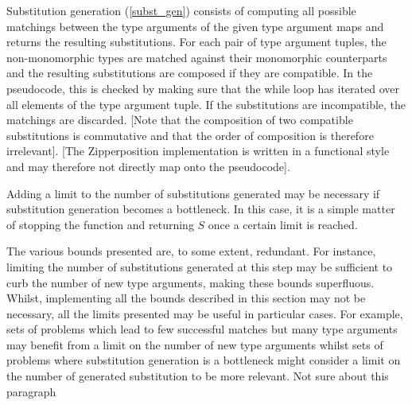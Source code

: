 \documentclass[]{ceurart}
\begin{document}
Substitution generation (\ref{subst_gen}) consists of computing all possible matchings between the type arguments of the given type argument maps and returns the resulting substitutions. For each pair of type argument tuples, the non-monomorphic types are matched against their monomorphic counterparts and the resulting substitutions are composed if they are compatible. In the pseudocode, this is checked by making sure that the while loop has iterated over all elements of the type argument tuple. If the substitutions are incompatible, the matchings are discarded. [Note that the composition of two compatible substitutions is commutative and that the order of composition is therefore irrelevant]. [The Zipperposition implementation is written in a functional style and may therefore not directly map onto the pseudocode].

Adding a limit to the number of substitutions generated may be necessary if substitution generation becomes a bottleneck. In this case, it is a simple matter of stopping the function and returning \(S\) once a certain limit is reached.

The various bounds presented are, to some extent, redundant. For instance, limiting the number of substitutions generated at this step may be sufficient to curb the number of new type arguments, making these bounds superfluous. Whilst, implementing all the bounds described in this section may not be necessary, all the limits presented may be useful in particular cases. For example, sets of problems which lead to few successful matches but many type arguments may benefit from a limit on the number of new type arguments whilst sets of problems where substitution generation is a bottleneck might consider a limit on the number of generated substitution to be more relevant. Not sure about this paragraph
\end{document}
